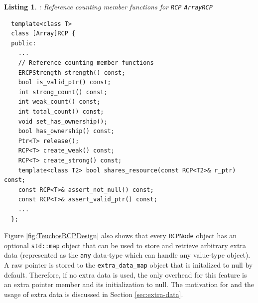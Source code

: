 \documentclass[pdf,ps2pdf,11pt]{SANDreport}
\newtheorem{listing}{Listing}
\begin{document}
\begin{listing}: Reference counting member functions for {}\texttt{RCP}
{}\texttt{ArrayRCP} \\
\label{listing:ref-count-mem-funcs}
{\small\begin{verbatim}
  template<class T>
  class [Array]RCP {
  public:
    ...
    // Reference counting member functions
    ERCPStrength strength() const;
    bool is_valid_ptr() const;
    int strong_count() const;
    int weak_count() const;
    int total_count() const;
    void set_has_ownership();
    bool has_ownership() const;
    Ptr<T> release();
    RCP<T> create_weak() const;
    RCP<T> create_strong() const;
    template<class T2> bool shares_resource(const RCP<T2>& r_ptr) const;
    const RCP<T>& assert_not_null() const;
    const RCP<T>& assert_valid_ptr() const;
    ...
  };
\end{verbatim}}
\end{listing}


Figure {}\ref{fig:TeuchosRCPDesign} also shows that every
{}\texttt{RCPNode} object has an optional {}\texttt{std::map} object
that can be used to store and retrieve arbitrary extra data
(represented as the {}\texttt{any} data-type which can handle any
value-type object).  A raw pointer is stored to the
{}\texttt{extra\_data\_map} object that is initalized to null by
default.  Therefore, if no extra data is used, the only overhead for
this feature is an extra pointer member and its initialization to
null.  The motivation for and the usage of extra data is discussed in
Section {}\ref{sec:extra-data}.
\end{document}
